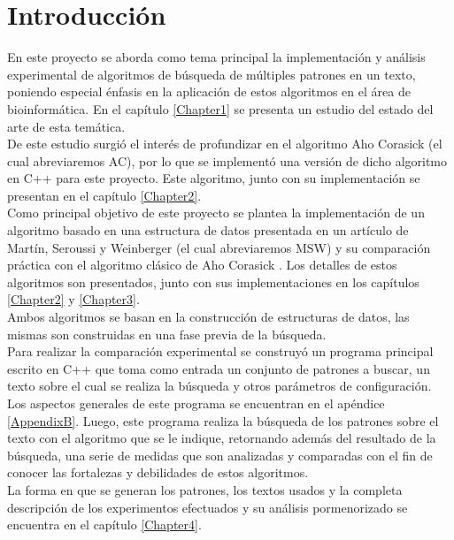
\chapter{Introducción} %

\label{Introduction}


En este proyecto se aborda como tema principal la implementación y análisis experimental de algoritmos de búsqueda de múltiples patrones en un texto, poniendo especial énfasis en la aplicación de estos algoritmos en el área de bioinformática. En el capítulo \ref{Chapter1} se presenta un estudio del estado del arte de esta temática.\\
De este estudio surgió el interés de profundizar en el algoritmo Aho Corasick (el cual abreviaremos AC), por lo que se implementó una versión de dicho algoritmo en C++ para este proyecto. Este algoritmo, junto con su implementación se presentan en el capítulo \ref{Chapter2}.\\
Como principal objetivo de este proyecto se plantea la implementación de un algoritmo basado en una estructura de datos presentada en un artículo de Martín, Seroussi y Weinberger (el cual abreviaremos MSW) \cite{MSW04} y su comparación práctica con el algoritmo clásico de Aho Corasick \cite{AC75}. Los detalles de estos algoritmos son presentados, junto con sus implementaciones en los capítulos \ref{Chapter2} y \ref{Chapter3}.\\
Ambos algoritmos se basan en la construcción de estructuras de datos, las mismas son construidas en una fase previa de la búsqueda.\\
Para realizar la comparación experimental se construyó un programa principal escrito en C++ que toma como entrada un conjunto de patrones a buscar, un texto sobre el cual se realiza la búsqueda y otros parámetros de configuración. Los aspectos generales de este programa se encuentran en el apéndice \ref{AppendixB}. Luego, este programa realiza la búsqueda de los patrones sobre el texto con el algoritmo que se le indique, retornando además del resultado de la búsqueda, una serie de medidas que son analizadas y comparadas con el fin de conocer las fortalezas y debilidades de estos algoritmos.\\
La forma en que se generan los patrones, los textos usados y la completa descripción de los experimentos efectuados y su análisis pormenorizado se encuentra en el capítulo \ref{Chapter4}.\\

